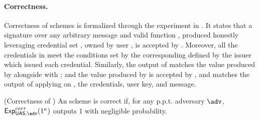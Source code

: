 
\paragraph{Correctness.} %
Correctness of \UAS schemes is formalized through the experiment in
. It states that a signature over any arbitrary message
and valid function \feval, produced honestly leveraging credential set \scid,
owned by user \uid, is accepted by \Verify. Moreover, all the credentials in
\scid meet the conditions set by the corresponding \fissue defined by the issuer
which issued each credential. Similarly, the output of \feval matches the
value produced by \Sign alongside with \sig; and the value produced by \Open
is accepted by \Judge, and matches the output of applying \finsp on \Yeval, the
credentials, user key, and message.

\begin{definition}{(Correctness of \UAS)}
  \label{def:correctness-uas}
  An \UAS scheme is correct if, for any p.p.t. adversary $\adv$,
  $\ExpCorrect(1^\secpar)$ outputs 1 with negligible probability.
\end{definition}


